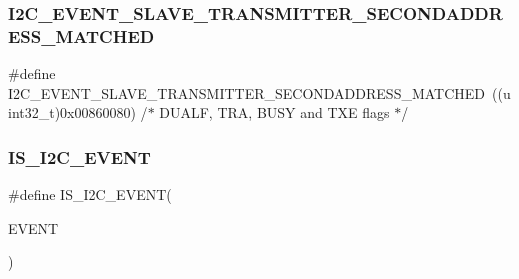 \subsubsection{\texorpdfstring{I2C\_EVENT\_SLAVE\_TRANSMITTER\_SECONDADDRESS\_MATCHED}{I2C\_EVENT\_SLAVE\_TRANSMITTER\_SECONDADDRESS\_MATCHED}}
{\footnotesize\ttfamily \#define I2\+C\+\_\+\+E\+V\+E\+N\+T\+\_\+\+S\+L\+A\+V\+E\+\_\+\+T\+R\+A\+N\+S\+M\+I\+T\+T\+E\+R\+\_\+\+S\+E\+C\+O\+N\+D\+A\+D\+D\+R\+E\+S\+S\+\_\+\+M\+A\+T\+C\+H\+ED~((uint32\+\_\+t)0x00860080)  /$\ast$ D\+U\+A\+L\+F, T\+R\+A, B\+U\+S\+Y and T\+X\+E flags $\ast$/}

\mbox{\label{group___i2_c___events_ga4b42e6936006195f89ff4f763d366970}} 
\subsubsection{\texorpdfstring{IS\_I2C\_EVENT}{IS\_I2C\_EVENT}}
{\footnotesize\ttfamily \#define I\+S\+\_\+\+I2\+C\+\_\+\+E\+V\+E\+NT(\begin{DoxyParamCaption}\item[{}]{E\+V\+E\+NT }\end{DoxyParamCaption})}

